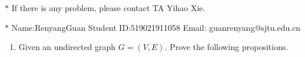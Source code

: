 \documentclass[12pt,a4paper]{article}
\theoremstyle{definition}
\begin{document}
\noindent

\noindent{}
\begin{center}
\footnotesize{\color{red}$*$ If there is any problem, please contact TA Yihao Xie. }

\footnotesize{\color{blue}$*$ Name:RenyangGuan  \quad Student ID:519021911058 \quad Email: guanrenyang@sjtu.edu.cn}
\end{center}

\begin{enumerate}

	\item Given an undirected graph $G = (V, E)$. Prove the following propositions.
	

\end{enumerate}
\end{document}
